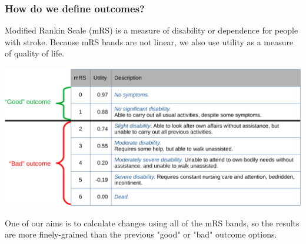\documentclass[xcolor={usenames,dvipsnames}]{beamer}
\begin{document}
\begin{frame}
\frametitle{How do we define outcomes?}

\footnotesize{Modified Rankin Scale (mRS) is a measure of disability or dependence for people with stroke.
Because mRS bands are not linear, we also use utility as a measure of quality of life.}

\begin{center} 
\includegraphics[width=1.0\textwidth]{./images/mRS_table}
\end{center} 


\footnotesize{One of our aims is to calculate changes using all of the mRS bands, so the results are more finely-grained than the previous "good" or "bad" outcome options.}

\end{frame}


\end{document}
